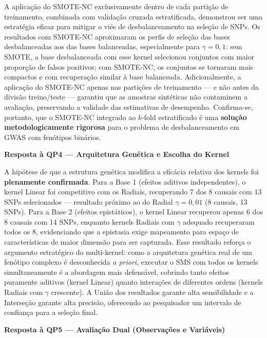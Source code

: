 \documentclass[
    12pt,
    a4paper,
    oneside,
    english,
    french,
    spanish,
    brazil
    ]{abntex2}
\newcommand{\novo}[1]{\textcolor{corNova}{#1}}
\begin{document}
\novo{A aplicação do SMOTE-NC exclusivamente dentro de cada partição de treinamento, combinada com validação cruzada estratificada, demonstrou ser uma estratégia eficaz para mitigar o viés de desbalanceamento na seleção de SNPs. Os resultados com SMOTE-NC aproximaram os perfis de seleção das bases desbalanceadas aos das bases balanceadas, especialmente para $\gamma = 0{,}1$: sem SMOTE, a base desbalanceada com esse kernel selecionou conjuntos com maior proporção de falsos positivos; com SMOTE-NC, os conjuntos se tornaram mais compactos e com recuperação similar à base balanceada. Adicionalmente, a aplicação do SMOTE-NC apenas nas partições de treinamento --- e não antes da divisão treino/teste --- garantiu que as amostras sintéticas não contaminem a avaliação, preservando a validade das estimativas de desempenho. Confirma-se, portanto, que o SMOTE-NC integrado ao $k$-fold estratificado é uma \textbf{solução metodologicamente rigorosa} para o problema de desbalanceamento em GWAS com fenótipos binários.}

\bigskip
\noindent\textbf{Resposta à QP4 --- Arquitetura Genética e Escolha do Kernel}

\novo{A hipótese de que a estrutura genética modifica a eficácia relativa dos kernels foi \textbf{plenamente confirmada}. Para a Base 1 (efeitos aditivos independentes), o kernel Linear foi competitivo com os Radiais, recuperando 7 dos 8 causais com 13 SNPs selecionados --- resultado próximo ao do Radial $\gamma = 0{,}01$ (8 causais, 13 SNPs). Para a Base 2 (efeitos epistáticos), o kernel Linear recuperou apenas 6 dos 8 causais com 14 SNPs, enquanto kernels Radiais com $\gamma$ adequado recuperaram todos os 8, evidenciando que a epistasia exige mapeamento para espaço de características de maior dimensão para ser capturada. Esse resultado reforça o argumento estratégico do multi-kernel: como a arquitetura genética real de um fenótipo complexo é desconhecida \textit{a priori}, executar o SMS com todos os kernels simultaneamente é a abordagem mais defensável, cobrindo tanto efeitos puramente aditivos (kernel Linear) quanto interações de diferentes ordens (kernels Radiais com $\gamma$ crescente). A União dos resultados garante alta sensibilidade e a Interseção garante alta precisão, oferecendo ao pesquisador um intervalo de confiança para a seleção final.}

\bigskip
\noindent\textbf{Resposta à QP5 --- Avaliação Dual (Observações e Variáveis)}
\end{document}
